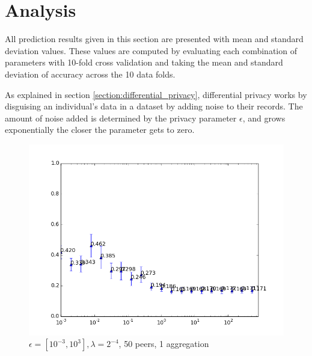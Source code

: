 
\chapter{Analysis}


All prediction results given in this section are presented with mean and standard deviation values. These values are computed by evaluating each combination of parameters with 10-fold cross validation and taking the mean and standard deviation of accuracy across the 10 data folds.

As explained in section \ref{section:differential_privacy}, differential privacy works by disguising an individual's data in a dataset by adding noise to their records. The amount of noise added is determined by the privacy parameter  $\epsilon$, and grows exponentially the closer the parameter gets to zero. 

\begin{figure}[H]
	\centering
	\includegraphics[width=\textwidth]{fig/eps2e-10-2e9,bud=eps,peers50,groups50,reg2e-4}
 	\caption{$\epsilon = [10^{-3}, 10^{3}], \lambda = 2^{-4}$, 50 peers, 1 aggregation}
 	\label{fig:epsilon_big_range}
\end{figure}
 
